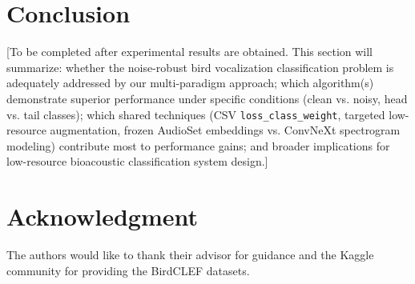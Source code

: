 \documentclass[conference]{IEEEtran}
\begin{document}
\section{Conclusion}

[To be completed after experimental results are obtained. This section will summarize: whether the noise-robust bird vocalization classification problem is adequately addressed by our multi-paradigm approach; which algorithm(s) demonstrate superior performance under specific conditions (clean vs. noisy, head vs. tail classes); which shared techniques (CSV \texttt{loss\_class\_weight}, targeted low-resource augmentation, frozen AudioSet embeddings vs. ConvNeXt spectrogram modeling) contribute most to performance gains; and broader implications for low-resource bioacoustic classification system design.]


\section*{Acknowledgment}

The authors would like to thank their advisor for guidance and the Kaggle community for providing the BirdCLEF datasets.




\end{document}
